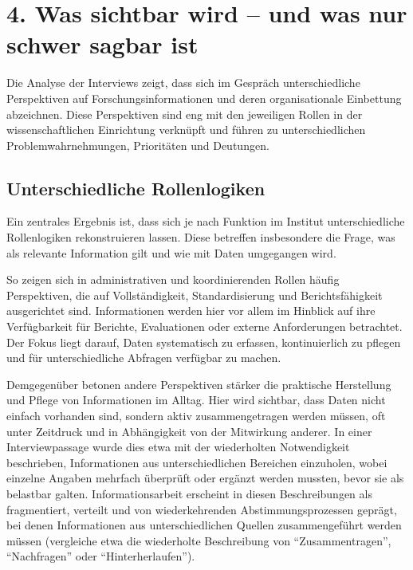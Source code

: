 \documentclass[a4paper,
fontsize=11pt,
oneside,
numbers=noperiodatend,
parskip=half-,
bibliography=totoc,
final
]{scrartcl}
\begin{document}
\section{4. Was sichtbar wird -- und was nur schwer sagbar
ist}\label{was-sichtbar-wird-und-was-nur-schwer-sagbar-ist}

Die Analyse der Interviews zeigt, dass sich im Gespräch unterschiedliche
Perspektiven auf Forschungsinformationen und deren organisationale
Einbettung abzeichnen. Diese Perspektiven sind eng mit den jeweiligen
Rollen in der wissenschaftlichen Einrichtung verknüpft und führen zu
unterschiedlichen Problemwahrnehmungen, Prioritäten und Deutungen.

\subsection{Unterschiedliche
Rollenlogiken}\label{unterschiedliche-rollenlogiken}

Ein zentrales Ergebnis ist, dass sich je nach Funktion im Institut
unterschiedliche Rollenlogiken rekonstruieren lassen. Diese betreffen
insbesondere die Frage, was als relevante Information gilt und wie mit
Daten umgegangen wird.

So zeigen sich in administrativen und koordinierenden Rollen häufig
Perspektiven, die auf Vollständigkeit, Standardisierung und
Berichtsfähigkeit ausgerichtet sind. Informationen werden hier vor allem
im Hinblick auf ihre Verfügbarkeit für Berichte, Evaluationen oder
externe Anforderungen betrachtet. Der Fokus liegt darauf, Daten
systematisch zu erfassen, kontinuierlich zu pflegen und für
unterschiedliche Abfragen verfügbar zu machen.

Demgegenüber betonen andere Perspektiven stärker die praktische
Herstellung und Pflege von Informationen im Alltag. Hier wird sichtbar,
dass Daten nicht einfach vorhanden sind, sondern aktiv zusammengetragen
werden müssen, oft unter Zeitdruck und in Abhängigkeit von der
Mitwirkung anderer. In einer Interviewpassage wurde dies etwa mit der
wiederholten Notwendigkeit beschrieben, Informationen aus
unterschiedlichen Bereichen einzuholen, wobei einzelne Angaben mehrfach
überprüft oder ergänzt werden mussten, bevor sie als belastbar galten.
Informationsarbeit erscheint in diesen Beschreibungen als fragmentiert,
verteilt und von wiederkehrenden Abstimmungsprozessen geprägt, bei denen
Informationen aus unterschiedlichen Quellen zusammengeführt werden
müssen (vergleiche etwa die wiederholte Beschreibung von
\enquote{Zusammentragen}, \enquote{Nachfragen} oder
\enquote{Hinterherlaufen}).
\end{document}
